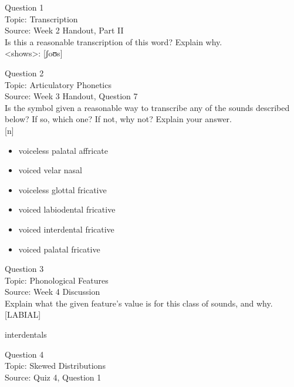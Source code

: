 \documentclass[12pt]{article}
\begin{document}
{\large Question 1}\\

Topic: Transcription\\
Source: Week 2 Handout, Part II\\

Is this a reasonable transcription of this word? Explain why.\\

<shows>: {[ʃoʊs]}


\newpage

{\large Question 2}\\

Topic: Articulatory Phonetics\\
Source: Week 3 Handout, Question 7\\

Is the symbol given a reasonable way to transcribe any of the sounds described below? If so, which one? If not, why not? Explain your answer.\\

{[n]}

\begin{itemize} \item voiceless palatal affricate \item voiced velar nasal \item voiceless glottal fricative \item voiced labiodental fricative \item voiced interdental fricative \item voiced palatal fricative \end{itemize}


\newpage

{\large Question 3}\\

Topic: Phonological Features\\
Source: Week 4 Discussion\\

Explain what the given feature’s value is for this class of sounds, and why.\\

{[LABIAL]}

interdentals


\newpage

{\large Question 4}\\

Topic: Skewed Distributions\\
Source: Quiz 4, Question 1\\
\end{document}
